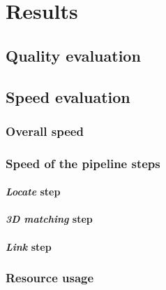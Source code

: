 \chapter{Results}
\label{chap:results}

\section{Quality evaluation}

\section{Speed evaluation}
\subsection{Overall speed}
\subsection{Speed of the pipeline steps}
\subsubsection{\textit{Locate} step}
\subsubsection{\textit{3D matching} step}
\subsubsection{\textit{Link} step}
\subsection{Resource usage}
